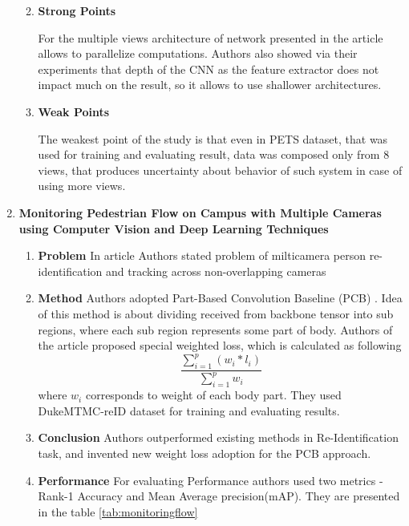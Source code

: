 \begin{enumerate}
\begin{enumerate}
\begin{center}
        \end{center}
        
        \item \textbf{Strong Points}
        
        For the multiple views architecture of network presented in the article allows to parallelize computations. Authors also showed via their experiments that depth of the CNN as the feature extractor does not impact much on the result, so it allows to use shallower architectures.
        
        \item \textbf{Weak Points}
        
        The weakest point of the study is that even in PETS dataset, that was used for training and evaluating result, data was composed only from 8 views, that produces uncertainty about behavior of such system in case of using more views.
    \end{enumerate}
    \item \textbf{Monitoring Pedestrian Flow on Campus with Multiple Cameras using Computer Vision and Deep Learning Techniques}
    \begin{enumerate}
        \item \textbf{Problem}
        In article \cite{monitoring2019} Authors stated problem of milticamera person re-identification and tracking across non-overlapping cameras
        \item \textbf{Method}
        Authors adopted Part-Based Convolution Baseline (PCB) \cite{sun2017models}. Idea of this method is about dividing received from backbone tensor into sub regions, where each sub region represents some part of body. Authors of the article proposed special weighted loss, which is calculated as following \[\dfrac{\sum_{i=1}^p (w_i*l_i)}{\sum_{i=1}^p w_i} \] where $w_i$ corresponds to weight of each body part. They used DukeMTMC-reID\cite{zheng2017unlabeled} dataset for training and evaluating results.
        \item \textbf{Conclusion}
        Authors outperformed existing methods in Re-Identification task, and invented new weight loss adoption for the PCB approach. 
        \item \textbf{Performance}
        For evaluating Performance authors used two metrics - Rank-1 Accuracy and Mean Average precision(mAP). They are presented in the table \ref{tab:monitoringflow}
        \\
        

\end{enumerate}
\end{enumerate}
